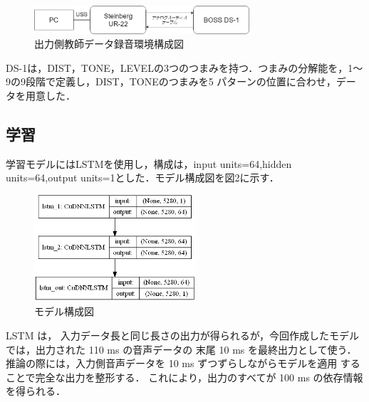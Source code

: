 \documentclass{jarticle}
\begin{document}
\begin{figure}[htbp]
 \begin{center}
  \includegraphics[width=80mm]{env.png}
 \end{center}
 \caption{出力側教師データ録音環境構成図}
 \label{fig:one}
\end{figure}


DS-1は，DIST，TONE，LEVELの3つのつまみを持つ．つまみの分解能を，1～9の9段階で定義し，DIST，TONEのつまみを5 パターンの位置に合わせ，データを用意した．

\subsection{学習}

学習モデルにはLSTMを使用し，構成は，input units=64,hidden units=64,output units=1とした．モデル構成図を図2に示す．

\begin{figure}[htbp]
 \begin{center}
  \includegraphics[width=60mm]{model.png}
 \end{center}
 \caption{モデル構成図}
 \label{fig:one}
\end{figure}

LSTM は， 入力データ長と同じ長さの出力が得られるが，今回作成したモデルでは，出力された 110 ms の音声データの 末尾 10 ms を最終出力として使う．
推論の際には，入力側音声データを 10 ms ずつずらしながらモデルを適用 することで完全な出力を整形する．
これにより，出力のすべてが 100 ms の依存情報を得られる．

\end{document}
